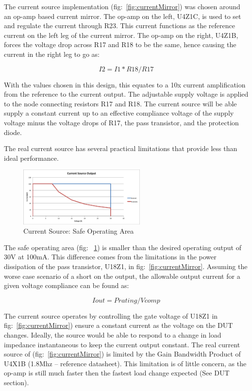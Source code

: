 \documentclass[journal]{IEEEtran}
\begin{document}
The current source implementation (fig:~\ref{fig:currentMirror}) was chosen around an op-amp based current mirror. The op-amp on the left, U4Z1C, is used to set and regulate the current through R23. This current functions as the reference current on the left leg of the current mirror. The op-amp on the right, U4Z1B, forces the voltage drop across R17 and R18 to be the same, hence causing the current in the right leg to go as:

\begin{equation}
I2 = I1*R18/R17
\end{equation}

With the values chosen in this design, this equates to a 10x current amplification from the reference to the current output. The adjustable supply voltage is applied to the node connecting resistors R17 and R18. The current source will be able supply a constant current up to an effective compliance voltage of the supply voltage minus the voltage drops of R17, the pass transistor, and the protection diode.

The real current source has several practical limitations that provide less than ideal performance. 

 
\begin{figure}[here]
\centering
\includegraphics[width=2.5in]{safeOpArea}
\caption{Current Source: Safe Operating Area}
\label{fig:safeOpArea}
\end{figure}

The safe operating area (fig: ~\ref{fig:safeOpArea}) is smaller than the desired operating output of 30V at 100mA. This difference comes from the limitations in the power dissipation of the pass transistor, U18Z1, in fig:~\ref{fig:currentMirror}. Assuming the worse case scenario of a short on the output, the allowable output current for a given voltage compliance can be found as:

\begin{equation}
Iout = Prating / Vcomp
\end{equation}

The current source operates by controlling the gate voltage of U18Z1 in fig:~\ref{fig:currentMirror}) ensure a constant current as the voltage on the DUT changes. Ideally, the source would be able to respond to a change in load impedance instantaneous to keep the current output constant. The real current source of (fig:~\ref{fig:currentMirror}) is limited by the Gain Bandwidth Product of U4X1B (1.8Mhz – reference datasheet). This limitation is of little concern, as the op-amp is still much faster then the fastest load change expected (See DUT section).
\end{document}
